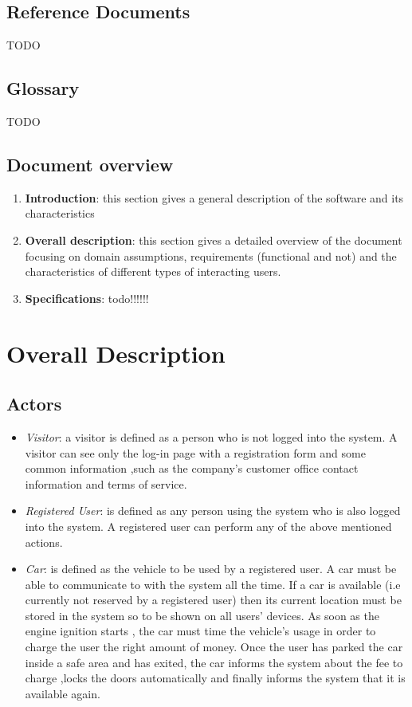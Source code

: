\documentclass[11pt]{article}
\begin{document}
	
	\subsection{Reference Documents}
	TODO
	\subsection{Glossary}
	TODO
	
	\subsection{Document overview}
	\begin{enumerate}
		\item \textbf{Introduction}: this section gives a general 	description of the software and its characteristics 
		\item \textbf{Overall description}: this section gives a detailed overview of the document focusing on domain assumptions, requirements (functional and not) and the characteristics of different types of interacting users.
		\item \textbf{Specifications}: todo!!!!!!
	\end{enumerate}	
	
	 \newpage
	\section{\Large Overall Description}
	
	 \subsection{Actors}
	  
	\begin{itemize}
 	 	\item \textit{Visitor}: a visitor is defined as a person who is not logged into the system. A visitor can see only the log-in page with a registration form and some common information ,such as the company's customer office contact information and terms of service.
  		\item \textit{Registered User}: is defined as any person using the system who is also logged into the system. A registered user can perform any of the above mentioned actions.
  		\item \textit{Car}: is defined as the vehicle to be used by a registered user. A car must be able to communicate to with the system all the time. If a car is available (i.e currently not reserved by a registered user) then its current location must be stored in the system so to be shown on all users' devices. As soon as the engine ignition starts , the car must time the vehicle's usage in order to charge the user the right amount of money. Once the user has parked the car inside a safe area and has exited, the car informs the system about the fee to charge ,locks the doors automatically and finally informs the system that it is available again.
  		
	\end{itemize}
	
\end{document}
